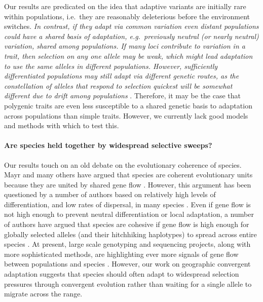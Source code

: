 \documentclass{article}
\newcommand{\mfp}[1]{{\it\color{red} #1} }
\begin{document}
Our results are predicated on the idea that adaptive variants are
initially rare within populations, i.e.\ they are reasonably
deleterious before the environment switches. \mfp{ In contrast, if they adapt via common variation even distant populations could have
a shared basis of adaptation, e.g.\ previously neutral (or nearly neutral) variation, shared among populations. 
If many loci contribute to variation in a trait, then
selection on any one allele may be weak, 
which might lead adaptation to use the same alleles in different populations.
However, sufficiently differentiated populations may still
adapt via different genetic routes, as the constellation of alleles
that respond to selection quickest will be somewhat different due to
drift among populations} \citep{Barton:89}.
Therefore, it may be the case that polygenic traits are even less susceptible to a shared
genetic basis to adaptation across populations than simple traits.   
However, we currently lack good models and methods with which to test this.


\paragraph{Are species held together by widespread selective sweeps?}
Our results touch on an old debate on the evolutionary coherence of species. 
Mayr and many others have argued that species are coherent
evolutionary units because they are united by shared gene flow \citep[pages 521--522 in][]{Mayr:SpeciesEvol}. 
However, this argument has been questioned by a number of authors 
based on relatively high levels of differentiation, and low rates of dispersal, in many species \citep{EhrlichRaven:69,Levin:79}.
Even if gene flow is not high enough to prevent neutral differentiation or local adaptation, 
a number of authors have argued that species are cohesive 
if gene flow is high enough for globally selected alleles 
(and their hitchhiking haplotypes)
to spread across entire species 
\citep[see also][]{Rieseberg2001,MorjanRieseberg:04,Ellstrand2014}.
At present, large scale genotyping and sequencing projects, 
along with more sophisticated methods, 
are highlighting ever more signals of gene flow between populations and species \citep{Patterson:12,SousaHey:13,Hellenthal:14}.
However, our work on geographic convergent adaptation
\citep[see also][]{ralphcoop2010,RalphCoop:14} 
suggests that species should often adapt to
widespread selection pressures through convergent evolution rather
than waiting for a single allele to migrate across the range. 
\end{document}
